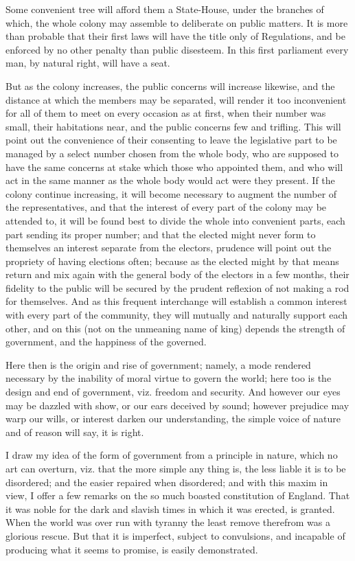 \documentclass[12pt,oneside]{memoir}
\begin{document}
Some convenient tree will afford them a State-House, under the
branches of which, the whole colony may assemble to deliberate on
public matters. It is more than probable that their first laws will
have the title only of Regulations, and be enforced by no other
penalty than public disesteem. In this first parliament every man,
by natural right, will have a seat.

But as the colony increases, the public concerns will increase
likewise, and the distance at which the members may be separated,
will render it too inconvenient for all of them to meet on every
occasion as at first, when their number was small, their habitations
near, and the public concerns few and trifling. This will point out
the convenience of their consenting to leave the legislative part to
be managed by a select number chosen from the whole body, who are
supposed to have the same concerns at stake which those who
appointed them, and who will act in the same manner as the whole
body would act were they present. If the colony continue increasing,
it will become necessary to augment the number of the
representatives, and that the interest of every part of the colony
may be attended to, it will be found best to divide the whole into
convenient parts, each part sending its proper number; and that the
elected might never form to themselves an interest separate from the
electors, prudence will point out the propriety of having elections
often; because as the elected might by that means return and mix
again with the general body of the electors in a few months, their
fidelity to the public will be secured by the prudent reflexion of
not making a rod for themselves. And as this frequent interchange
will establish a common interest with every part of the community,
they will mutually and naturally support each other, and on this
(not on the unmeaning name of king) depends the strength of
government, and the happiness of the governed.

Here then is the origin and rise of government; namely, a mode
rendered necessary by the inability of moral virtue to govern the
world; here too is the design and end of government, viz. freedom
and security. And however our eyes may be dazzled with show, or our
ears deceived by sound; however prejudice may warp our wills, or
interest darken our understanding, the simple voice of nature and of
reason will say, it is right.

I draw my idea of the form of government from a principle in nature,
which no art can overturn, viz. that the more simple any thing is,
the less liable it is to be disordered; and the easier repaired when
disordered; and with this maxim in view, I offer a few remarks on
the so much boasted constitution of England. That it was noble for
the dark and slavish times in which it was erected, is granted. When
the world was over run with tyranny the least remove therefrom was a
glorious rescue. But that it is imperfect, subject to convulsions,
and incapable of producing what it seems to promise, is easily
demonstrated.
\end{document}
